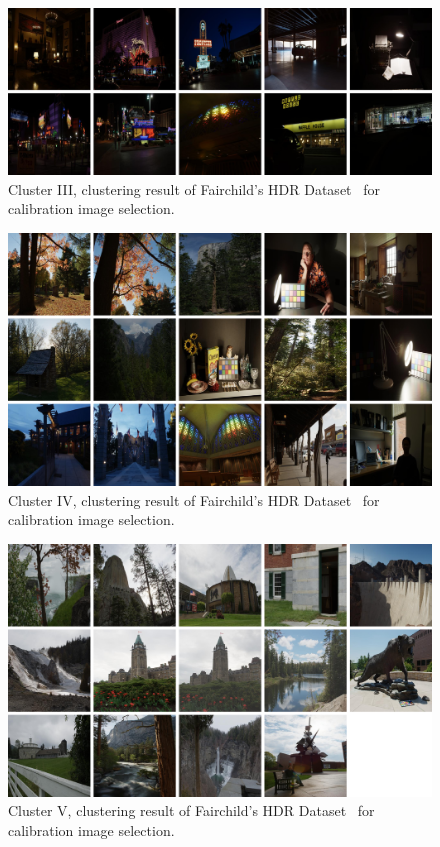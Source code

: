\begin{figure}
\begin{center}
\includegraphics[width=\textwidth]{appendix1/cluster3.png}
\caption{Cluster III, clustering result of Fairchild's HDR Dataset~\cite{fairchild2007hdr} for calibration image selection.}
\end{center}
\end{figure}

\begin{figure}
\begin{center}
\includegraphics[width=\textwidth]{appendix1/cluster4.png}
\caption{Cluster IV, clustering result of Fairchild's HDR Dataset~\cite{fairchild2007hdr} for calibration image selection.}
\end{center}
\end{figure}

\begin{figure}
\begin{center}
\includegraphics[width=\textwidth]{appendix1/cluster5.png}
\caption{Cluster V, clustering result of Fairchild's HDR Dataset~\cite{fairchild2007hdr} for calibration image selection.}
\end{center}
\end{figure}


